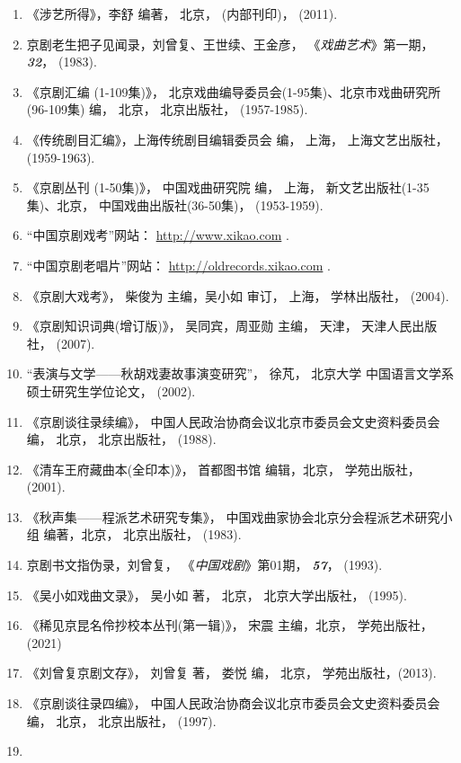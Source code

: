 \begin{enumerate}
\def\labelenumi{\arabic{enumi}.}
\setcounter{enumi}{2}
\item
  《涉艺所得》，李舒 编著， 北京， (内部刊印)， (2011).
\item
  京剧老生把子见闻录，刘曾复、王世续、王金彦，
  《\emph{戏曲艺术}》第一期， \emph{\textbf{32}}， (1983).
\item
  《京剧汇编 (1-109集)》，
  北京戏曲编导委员会(1-95集)、北京市戏曲研究所(96-109集) 编， 北京，
  北京出版社， (1957-1985).
\item
  《传统剧目汇编》，上海传统剧目编辑委员会 编， 上海，
  上海文艺出版社，(1959-1963).
\item
  《京剧丛刊 (1-50集)》， 中国戏曲研究院 编， 上海，
  新文艺出版社(1-35集)、北京， 中国戏曲出版社(36-50集)， (1953-1959).
\item
  ``中国京剧戏考''网站：
  \href{http://www.xikao.com/}{{http://www.xikao.com}} .
\item
  ``中国京剧老唱片''网站：
  \href{http://oldrecords.xikao.com/}{{http://oldrecords.xikao.com}} .
\item
  《京剧大戏考》， 柴俊为 主编，吴小如 审订， 上海， 学林出版社，
  (2004).
\item
  《京剧知识词典(增订版)》， 吴同宾，周亚勋 主编， 天津，
  天津人民出版社， (2007).
\item
  ``表演与文学------秋胡戏妻故事演变研究''， 徐芃， 北京大学
  中国语言文学系 硕士研究生学位论文， (2002).
\item
  《京剧谈往录续编》， 中国人民政治协商会议北京市委员会文史资料委员会
  编， 北京， 北京出版社， (1988).
\item
  《清车王府藏曲本(全印本)》， 首都图书馆 编辑，北京， 学苑出版社，
  (2001).
\item
  《秋声集------程派艺术研究专集》，
  中国戏曲家协会北京分会程派艺术研究小组 编著，北京， 北京出版社，
  (1983).
\item
  京剧书文指伪录，刘曾复， 《\emph{中国戏剧}》第01期，
  \emph{\textbf{57}}， (1993).
\item
  《吴小如戏曲文录》， 吴小如 著， 北京， 北京大学出版社， (1995).
\item
  《稀见京昆名伶抄校本丛刊(第一辑)》， 宋震 主编，北京， 学苑出版社，
  (2021)
\item
  《刘曾复京剧文存》， 刘曾复 著， 娄悦 编， 北京， 学苑出版社，(2013).
\item
  《京剧谈往录四编》， 中国人民政治协商会议北京市委员会文史资料委员会
  编， 北京， 北京出版社， (1997).
\item

\end{enumerate}
